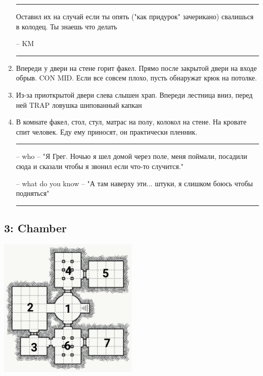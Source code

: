 \documentclass[a5paper,11pt]{book}
\newenvironment{boxed}
{\em\noindent\rule[1ex]{\linewidth}{0.1pt}\linebreak\indent}
{\par\noindent\rule[1ex]{\linewidth}{0.1pt}}
\begin{document}
\begin{multicols}{2}
\begin{enumerate}
\begin{boxed}
  Оставил их на случай если ты опять ("как придурок" зачерикано) свалишься в колодец. Ты знаешь что делать 

-- KM
\end{boxed}

\item Впереди у двери на стене горит факел. Прямо после закрытой двери на входе обрыв. CON MID. Если все совсем плохо, пусть обнаружат крюк на потолке.
\item Из-за приоткрытой двери слева слышен храп. Впереди лестница вниз, перед ней TRAP ловушка шипованный капкан
\item В комнате факел, стол, стул, матрас на полу, колокол на стене. На кровате спит человек. Еду ему приносят, он практически пленник. 

\begin{boxed}
-- who -- "Я Грег. Ночью я шел домой через поле, меня поймали, посадили сюда и сказали чтобы я звонил если что-то случится." 

-- what do you know -- "А там наверху эти... штуки, я слишком боюсь чтобы подняться"
\end{boxed}
\end{enumerate}

\subsection{3: Chamber}
\includegraphics[width=0.5\textwidth]{3}


\end{multicols}
\end{document}
